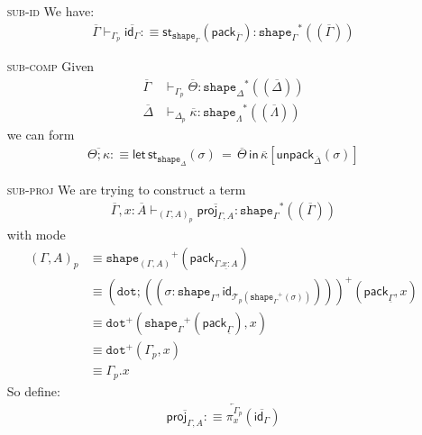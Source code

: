 \documentclass[10pt]{article}
\theoremstyle{definition}
\newcommand{\yields}{\vdash}
\newcommand{\sigmacl}[3]{\ensuremath{(#1{:}#2,#3)}}
\newcommand{\id}{\mathsf{id}}
\newcommand{\rewrite}[2]{\overleftarrow{#1}(#2)}
\newcommand\St[2]{\ensuremath{{#1}^*(#2)}}
\newcommand\StI[2]{\ensuremath{\mathsf{st}_{#1}(#2)}}
\newcommand\StE[4]{\ensuremath{\mathsf{let} \, \StI{#1}{#3} \, = \, {#2} \, \mathsf{in} \, #4}}
\newcommand\TrPlus[2]{\ensuremath{{#1}^+(#2)}}
\newcommand\El[2]{\mathcal{T}_{#1}(#2)}
\newcommand\ctxtuple[1]{(#1)}
\newcommand\pack[1]{\ensuremath{\mathsf{pack}_{#1}}}
\newcommand\unpack[2]{\ensuremath{\mathsf{unpack}_{#1}(#2)}}
\newcommand{\modeof}[1]{{#1}_p}
\newcommand{\tdot}{\ensuremath{\mathtt{dot}}}
\newcommand{\tshape}[1]{\ensuremath{\mathtt{shape}_{#1}}}
\newcommand{\upstairs}[1]{\overline{#1}}
\newcommand{\downstairs}[1]{\underline{#1}}
\newcommand\proj[1]{\ensuremath{\mathsf{proj}_{#1}}}
\begin{document}
\begin{enumerate}
\item[\textsc{sub-id}] We have:
\begin{align*}
\upstairs{\Gamma} \yields_{\modeof{\Gamma}} \upstairs{\id_\Gamma} :\equiv \StI{\tshape{\Gamma}}{\pack{\upstairs{\Gamma}}} : \St{\tshape{\Gamma}}{\ctxtuple{\upstairs{\Gamma}}}
\end{align*}

\item[\textsc{sub-comp}]
Given 
\begin{align*}
\upstairs{\Gamma} &\yields_{\modeof{\Gamma}} \upstairs{\Theta} : \St{\tshape{\Delta}}{\ctxtuple{\upstairs{\Delta}}} \\
\upstairs{\Delta} &\yields_{\modeof{\Delta}} \upstairs{\kappa} : \St{\tshape{\Lambda}}{\ctxtuple{\upstairs{\Lambda}}}
\end{align*}
we can form
\begin{align*}
\upstairs{\Theta;\kappa} :\equiv \StE{\tshape{\Delta}}{\upstairs{\Theta}}{\sigma}{\upstairs{\kappa}[\unpack{\upstairs{\Delta}}{\sigma}]}
\end{align*}

\item[\textsc{sub-proj}] We are trying to construct a term
\begin{align*}
\upstairs{\Gamma}, x : \upstairs{A} \yields_{\modeof{(\Gamma, A)}} \upstairs{\proj{\Gamma, A}} : \St{\tshape{\Gamma}}{\ctxtuple{\upstairs{\Gamma}}}
\end{align*}
with mode
\begin{align*}
\modeof{(\Gamma, A)}
&\equiv \TrPlus{\tshape{(\Gamma, A)}}{\pack{\downstairs{\Gamma. x : A}}} \\
&\equiv \TrPlus{(\tdot ; (\sigmacl{\sigma}{\tshape{\Gamma}}{\id_{\El{p}{\TrPlus{\tshape{\Gamma}}{\sigma}}}}))}{\pack{\downstairs{\Gamma}}, x} \\
&\equiv \TrPlus{\tdot}{\TrPlus{\tshape{\Gamma}}{\pack{\downstairs{\Gamma}}}, x} \\
&\equiv \TrPlus{\tdot}{\modeof{\Gamma}, x} \\
&\equiv \modeof{\Gamma}.x
\end{align*}
So define:
\begin{align*}
\upstairs{\proj{\Gamma, A}} :\equiv \rewrite{\pi^{\modeof{\Gamma}}_x}{\upstairs{\id_\Gamma}}
\end{align*}


\end{enumerate}
\end{document}
